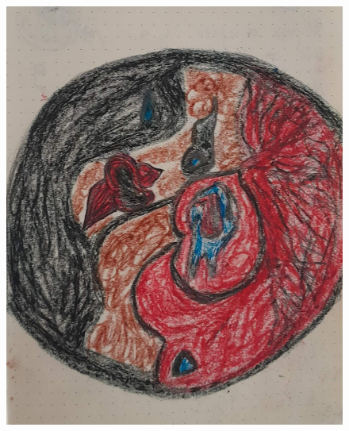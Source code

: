 \documentclass[12pt, a4paper, twoside]{book} %
\begin{document}
\begin{figure}[H]
	\centering
	\includegraphics[width=\textwidth]{./images/1f81324dd84b67.jpg}
\end{figure}
\end{document}
